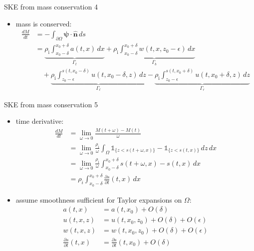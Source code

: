 \documentclass[10pt,dvipsnames]{beamer}
\newcommand{\hbn}{\hat{\mathbf{n}}}
\newcommand{\bpsi}{\bm{\psi}}
\newcommand{\eps}{\epsilon}
\newcommand{\rhoi}{\rho_{\text{i}}}
\begin{document}
\begin{frame}{SKE from mass conservation 4}

\begin{itemize}
\item mass is conserved:
\begin{align*}
\frac{dM}{dt} &= - \int_{\partial \Omega} \bpsi \cdot \hbn\,ds \\
  &= \underbrace{\rhoi \int_{x_0-\delta}^{x_0+\delta} a(t,x)\,dx}_{\Gamma_t} + \underbrace{\rhoi \int_{x_0-\delta}^{x_0+\delta} w(t,x,z_0-\eps)\,dx}_{\Gamma_b} \\
  &\quad + \underbrace{\rhoi \int_{z_0-\eps}^{s(t,x_0-\delta)} u(t,x_0-\delta,z)\,dz}_{\Gamma_\ell} - \underbrace{\rhoi \int_{z_0-\eps}^{s(t,x_0+\delta)} u(t,x_0+\delta,z)\,dz}_{\Gamma_r}
\end{align*}

\end{itemize}
\end{frame}


\begin{frame}{SKE from mass conservation 5}

\begin{itemize}
\item time derivative:
\begin{align*}
\frac{dM}{dt} &= \lim_{\omega\to 0} \frac{M(t+\omega) - M(t)}{\omega} \\
    &= \lim_{\omega\to 0} \frac{\rhoi}{\omega} \int_\Omega \mathbb{1}_{\{z<s(t+\omega,x)\}} - \mathbb{1}_{\{z<s(t,x)\}}\,dz\,dx \\
    &= \lim_{\omega\to 0} \frac{\rhoi}{\omega} \int_{x_0-\delta}^{x_0+\delta} s(t+\omega,x) - s(t,x)\,dx \\
    &= \rho_i \int_{x_0-\delta}^{x_0+\delta} \frac{\partial s}{\partial t}(t,x)\,dx
\end{align*}
\item assume smoothness sufficient for Taylor expansions on $\Omega$:
\begin{align*}
a(t,x) &= a(t,x_0) + O(\delta) \\
u(t,x,z) &= u(t,x_0,z_0) + O(\delta) + O(\eps) \\
w(t,x,z) &= w(t,x_0,z_0) + O(\delta) + O(\eps) \\
\frac{\partial s}{\partial t}(t,x) &= \frac{\partial s}{\partial t}(t,x_0) + O(\delta)
\end{align*}
\end{itemize}
\end{frame}
\end{document}
